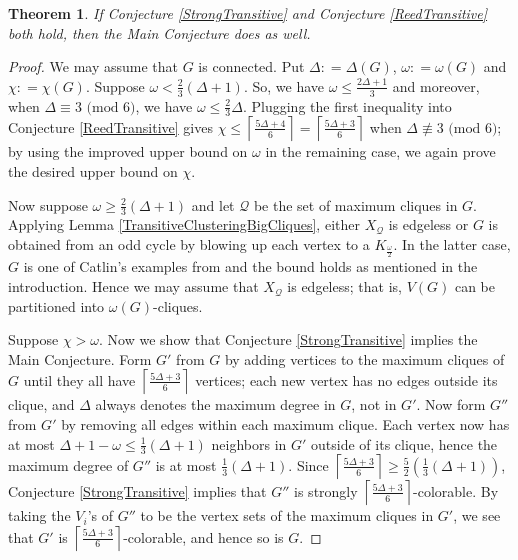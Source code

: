 \documentclass[12pt]{article}
\theoremstyle{plain}
\newtheorem{thm}{Theorem}[section]
\theoremstyle{definition}
\theoremstyle{remark}
\newcommand{\fancy}[1]{\mathcal{#1}}
\newcommand{\ceil}[1]{\left\lceil#1\right\rceil}
\newcommand{\parens}[1]{\left( #1 \right)}
\newcommand{\DefinedAs}{\mathrel{\mathop:}=}
\begin{document}
\begin{thm}\label{ConjectureaImplyConjecture}
If Conjecture \ref{StrongTransitive} and Conjecture \ref{ReedTransitive} both
hold, then the Main Conjecture does as well.
\end{thm}
\begin{proof}
We may assume that $G$ is connected. Put $\Delta \DefinedAs \Delta(G)$, $\omega
\DefinedAs \omega(G)$ and $\chi \DefinedAs \chi(G)$. Suppose $\omega < \frac23
\parens{\Delta + 1}$.  So, we have $\omega \le \frac{2\Delta + 1}{3}$ and
moreover, when $\Delta \equiv 3 \text{ (mod $6$)}$, we have $\omega \le \frac23
\Delta$.  Plugging the first inequality into Conjecture \ref{ReedTransitive}
gives $\chi \le \ceil{\frac{5\Delta + 4}{6}} = \ceil{\frac{5\Delta + 3}{6}}$
when $\Delta \not \equiv 3 \text{ (mod $6$)}$; by using the improved upper
bound on $\omega$ in the remaining case, we again prove the desired upper bound
on $\chi$.

Now suppose $\omega \ge \frac23 (\Delta + 1)$ and let $\fancy{Q}$ be the set of
maximum cliques in $G$.  Applying Lemma \ref{TransitiveClusteringBigCliques},
either $X_\fancy{Q}$ is edgeless or $G$ is obtained from an odd cycle by
blowing up each vertex to a $K_{\frac{\omega}{2}}$.  In the latter case, $G$ is
one of Catlin's examples from \cite{catlin1979hajos} and the bound holds as
mentioned in the introduction.  Hence we may assume that $X_\fancy{Q}$ is
edgeless; that is, $V(G)$ can be partitioned into $\omega(G)$-cliques.

Suppose $\chi > \omega$. Now we show that Conjecture \ref{StrongTransitive}
implies the Main Conjecture.
Form $G'$ from $G$ by adding vertices to the maximum cliques of $G$ until they
all have $\ceil{\frac{5\Delta + 3}{6}}$ vertices; each new vertex has no edges
outside its clique, and $\Delta$ always denotes the maximum degree in $G$, not
in $G'$. 
Now form $G''$ from $G'$ by removing all edges within each maximum clique.  
Each vertex now has at most $\Delta + 1 - \omega \le
\frac13 (\Delta + 1)$ neighbors in $G'$ outside of its clique, 
hence the maximum
degree of $G''$ is at most $\frac13(\Delta+1)$.  
Since $\ceil{\frac{5\Delta + 3}{6}} \ge
\frac52 \parens{\frac13 (\Delta + 1)}$, Conjecture \ref{StrongTransitive}
implies that $G''$ is strongly 
$\ceil{\frac{5\Delta + 3}{6}}$-colorable.
By taking the $V_i$'s of $G''$ to be the vertex sets of the maximum cliques in
$G'$, we see that $G'$ is $\ceil{\frac{5\Delta + 3}{6}}$-colorable, and hence
so is $G$.
\end{proof}
\end{document}
